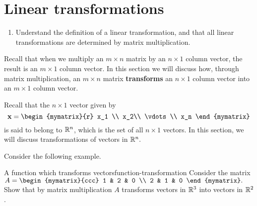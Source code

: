 \section{Linear transformations}

\begin{outcome}
  \begin{enumerate}
  \item Understand the definition of a linear transformation, and that
    all linear transformations are determined by matrix
    multiplication.
  \end{enumerate}
\end{outcome}

Recall that when we multiply an $m\times n$ matrix by an $n\times 1 $
column vector, the result is an $m\times 1$ column vector. In this
section we will discuss how, through matrix multiplication, an $m
\times n$ matrix \textbf{transforms} an $n\times 1$ column vector into
an $m \times 1$ column vector.

Recall that the $n \times 1$ vector given by
\begin{equation*}
\vect{x} = 
\begin{mymatrix}{r}
x_1 \\
x_2\\ 
\vdots \\
x_n
\end{mymatrix}
\end{equation*}
is said to belong to $\mathbb{R}^n$, which is the set of all $n \times 1$ vectors. In this section, we will discuss transformations of vectors in $\mathbb{R}^n.$ 

Consider the following example. 

\begin{example}{A function which transforms vectors}{function-transformation}
Consider the matrix $A = \begin{mymatrix}{ccc}
1 & 2 & 0 \\
2 & 1 & 0
\end{mymatrix} .$ 
Show that by matrix multiplication $A$ transforms vectors in $\mathbb{R}^3$ into vectors in $\mathbb{R}^2$.
\end{example}

